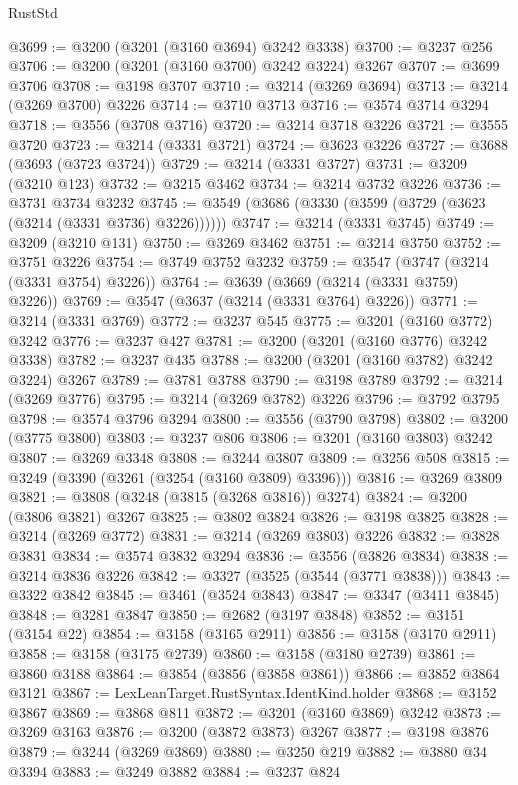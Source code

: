 \begin{lexlean}{RustStd}
\begin{coremodule}
@3699 := @3200 (@3201 (@3160 @3694) @3242 @3338)
@3700 := @3237 @256
@3706 := @3200 (@3201 (@3160 @3700) @3242 @3224) @3267
@3707 := @3699 @3706
@3708 := @3198 @3707
@3710 := @3214 (@3269 @3694)
@3713 := @3214 (@3269 @3700) @3226
@3714 := @3710 @3713
@3716 := @3574 @3714 @3294
@3718 := @3556 (@3708 @3716)
@3720 := @3214 @3718 @3226
@3721 := @3555 @3720
@3723 := @3214 (@3331 @3721)
@3724 := @3623 @3226
@3727 := @3688 (@3693 (@3723 @3724))
@3729 := @3214 (@3331 @3727)
@3731 := @3209 (@3210 @123)
@3732 := @3215 @3462
@3734 := @3214 @3732 @3226
@3736 := @3731 @3734 @3232
@3745 := @3549 (@3686 (@3330 (@3599 (@3729 (@3623 (@3214 (@3331 @3736) @3226))))))
@3747 := @3214 (@3331 @3745)
@3749 := @3209 (@3210 @131)
@3750 := @3269 @3462
@3751 := @3214 @3750
@3752 := @3751 @3226
@3754 := @3749 @3752 @3232
@3759 := @3547 (@3747 (@3214 (@3331 @3754) @3226))
@3764 := @3639 (@3669 (@3214 (@3331 @3759) @3226))
@3769 := @3547 (@3637 (@3214 (@3331 @3764) @3226))
@3771 := @3214 (@3331 @3769)
@3772 := @3237 @545
@3775 := @3201 (@3160 @3772) @3242
@3776 := @3237 @427
@3781 := @3200 (@3201 (@3160 @3776) @3242 @3338)
@3782 := @3237 @435
@3788 := @3200 (@3201 (@3160 @3782) @3242 @3224) @3267
@3789 := @3781 @3788
@3790 := @3198 @3789
@3792 := @3214 (@3269 @3776)
@3795 := @3214 (@3269 @3782) @3226
@3796 := @3792 @3795
@3798 := @3574 @3796 @3294
@3800 := @3556 (@3790 @3798)
@3802 := @3200 (@3775 @3800)
@3803 := @3237 @806
@3806 := @3201 (@3160 @3803) @3242
@3807 := @3269 @3348
@3808 := @3244 @3807
@3809 := @3256 @508
@3815 := @3249 (@3390 (@3261 (@3254 (@3160 @3809) @3396)))
@3816 := @3269 @3809
@3821 := @3808 (@3248 (@3815 (@3268 @3816)) @3274)
@3824 := @3200 (@3806 @3821) @3267
@3825 := @3802 @3824
@3826 := @3198 @3825
@3828 := @3214 (@3269 @3772)
@3831 := @3214 (@3269 @3803) @3226
@3832 := @3828 @3831
@3834 := @3574 @3832 @3294
@3836 := @3556 (@3826 @3834)
@3838 := @3214 @3836 @3226
@3842 := @3327 (@3525 (@3544 (@3771 @3838)))
@3843 := @3322 @3842
@3845 := @3461 (@3524 @3843)
@3847 := @3347 (@3411 @3845)
@3848 := @3281 @3847
@3850 := @2682 (@3197 @3848)
@3852 := @3151 (@3154 @22)
@3854 := @3158 (@3165 @2911)
@3856 := @3158 (@3170 @2911)
@3858 := @3158 (@3175 @2739)
@3860 := @3158 (@3180 @2739)
@3861 := @3860 @3188
@3864 := @3854 (@3856 (@3858 @3861))
@3866 := @3852 @3864 @3121
@3867 := LexLeanTarget.RustSyntax.IdentKind.holder
@3868 := @3152 @3867
@3869 := @3868 @811
@3872 := @3201 (@3160 @3869) @3242
@3873 := @3269 @3163
@3876 := @3200 (@3872 @3873) @3267
@3877 := @3198 @3876
@3879 := @3244 (@3269 @3869)
@3880 := @3250 @219
@3882 := @3880 @34 @3394
@3883 := @3249 @3882
@3884 := @3237 @824

\end{coremodule}
\end{lexlean}
